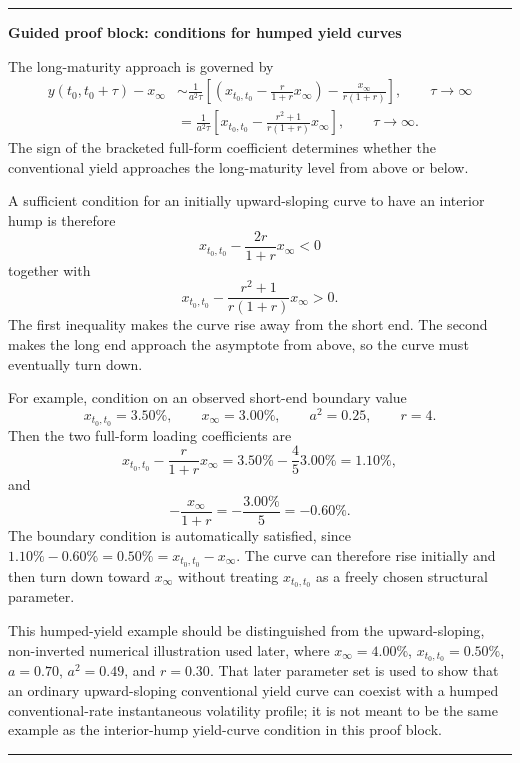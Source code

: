 \documentclass[11pt]{article}
\theoremstyle{plainbreak}
\newenvironment{proofblock}[1]{%
    \vspace{0.5em}\hrule\vspace{0.7em}%
    {\bfseries Guided proof block: #1}\par\vspace{0.2em}%
}{%
    \vspace{0.5em}\hrule\vspace{0.7em}%
}
\begin{document}
\begin{proofblock}{conditions for humped yield curves}
The long-maturity approach is governed by
\begin{align*}
    y(t_0,t_0+\tau)-x_\infty
    &\sim
    \frac{1}{a^2\tau}\left[
        \left(x_{t_0,t_0}-\frac{r}{1+r}x_\infty\right)
        -\frac{x_\infty}{r(1+r)}
    \right],
    \qquad \tau\to\infty \\
    &=
    \frac{1}{a^2\tau}\left[
        x_{t_0,t_0}-\frac{r^2+1}{r(1+r)}x_\infty
    \right],
    \qquad \tau\to\infty .
\end{align*}
The sign of the bracketed full-form coefficient determines whether the conventional yield approaches the long-maturity level from above or below.

A sufficient condition for an initially upward-sloping curve to have an interior hump is therefore
\begin{equation*}
    x_{t_0,t_0}-\frac{2r}{1+r}x_\infty<0
\end{equation*}
together with
\begin{equation*}
    x_{t_0,t_0}-\frac{r^2+1}{r(1+r)}x_\infty>0.
\end{equation*}
The first inequality makes the curve rise away from the short end. The second makes the long end approach the asymptote from above, so the curve must eventually turn down.

For example, condition on an observed short-end boundary value
\begin{equation*}
    x_{t_0,t_0}=3.50\%,
    \qquad x_\infty=3.00\%,
    \qquad a^2=0.25,
    \qquad r=4.
\end{equation*}
Then the two full-form loading coefficients are
\begin{equation*}
    x_{t_0,t_0}-\frac{r}{1+r}x_\infty
    =3.50\%-\frac{4}{5}3.00\%=1.10\%,
\end{equation*}
 and
\begin{equation*}
    -\frac{x_\infty}{1+r}
    =-\frac{3.00\%}{5}=-0.60\%.
\end{equation*}
The boundary condition is automatically satisfied, since \(1.10\%-0.60\%=0.50\%=x_{t_0,t_0}-x_\infty\). The curve can therefore rise initially and then turn down toward \(x_\infty\) without treating \(x_{t_0,t_0}\) as a freely chosen structural parameter.

This humped-yield example should be distinguished from the upward-sloping, non-inverted numerical illustration used later, where \(x_\infty=4.00\%\), \(x_{t_0,t_0}=0.50\%\), \(a=0.70\), \(a^2=0.49\), and \(r=0.30\). That later parameter set is used to show that an ordinary upward-sloping conventional yield curve can coexist with a humped conventional-rate instantaneous volatility profile; it is not meant to be the same example as the interior-hump yield-curve condition in this proof block.


\end{proofblock}
\end{document}
